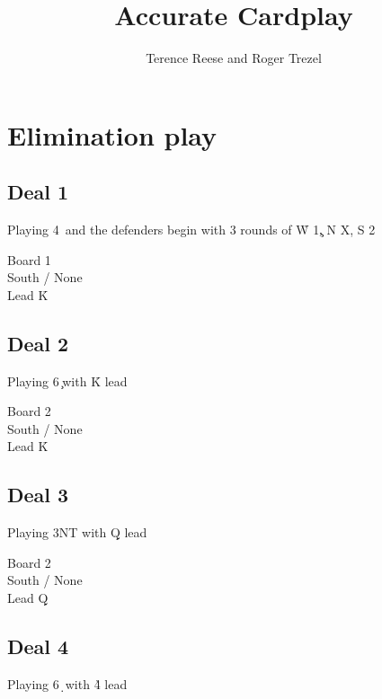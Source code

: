 \documentclass[a4paper]{article}
\title{Accurate Cardplay}
\author{Terence Reese and Roger Trezel}
\begin{document}
\maketitle
\tableofcontents

\section{Elimination play}

\subsection{Deal 1}

Playing 4\s\ and the defenders begin with 3 rounds of \h 

W 1\c , N X, S 2\s 

\dealdiagram
{\vhand{\void}{\void}{\void}{\void}}
{}
{\vhand{\void}{\void}{\void}{\void}}
{}
{Board 1\\South / None\\Lead \h K}

\subsection{Deal 2}

Playing 6\c\ with \h K lead

\dealdiagram
{\vhand{\void}{\void}{\void}{\void}}
{}
{\vhand{\void}{\void}{\void}{\void}}
{}
{Board 2\\South / None\\Lead \h K}

\subsection{Deal 3}

Playing 3NT with \d Q lead

\dealdiagram
{\vhand{\void}{\void}{\void}{\void}}
{}
{\vhand{\void}{\void}{\void}{\void}}
{}
{Board 2\\South / None\\Lead \d Q}

\subsection{Deal 4}

Playing 6\d\ with \h 4 lead
\end{document}

